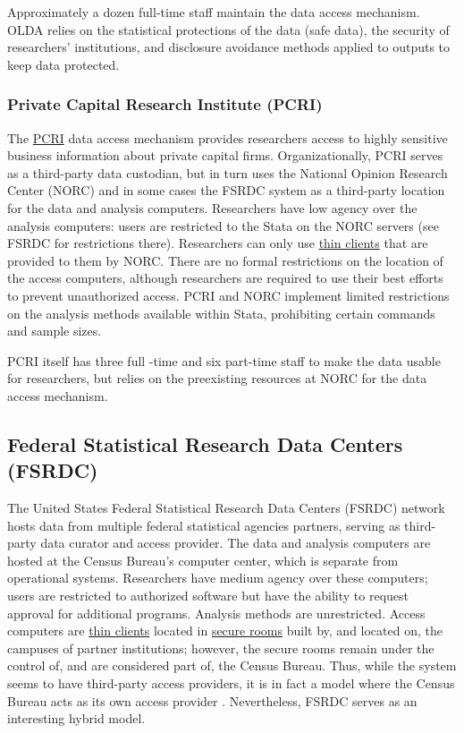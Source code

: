 Approximately a dozen full-time staff maintain the data access mechanism. OLDA relies on the statistical protections of the data (safe data), the security of researchers' institutions, and disclosure avoidance methods applied to outputs to keep data protected.

\hypertarget{private-capital-research-institute-pcri}{%
\subsubsection{Private Capital Research Institute (PCRI)}\label{private-capital-research-institute-pcri}}

The \protect\hyperlink{pcri}{PCRI} data access mechanism provides researchers access to highly sensitive business information about private capital firms. Organizationally, PCRI serves as a third-party data custodian, but in turn uses the National Opinion Research Center (NORC) and in some cases the FSRDC system as a third-party location for the data and analysis computers. Researchers have low agency over the analysis computers: users are restricted to the Stata on the NORC servers (see FSRDC for restrictions there). Researchers can only use \protect\hyperlink{thin-clients}{thin clients} that are provided to them by NORC. There are no formal restrictions on the location of the access computers, although researchers are required to use their best efforts to prevent unauthorized access. PCRI and NORC implement limited restrictions on the analysis methods available within Stata, prohibiting certain commands and sample sizes.

PCRI itself has three full -time and six part-time staff to make the data usable for researchers, but relies on the preexisting resources at NORC for the data access mechanism.

\hypertarget{federal-statistical-research-data-centers-fsrdc}{%
\subsection{Federal Statistical Research Data Centers (FSRDC)}\label{federal-statistical-research-data-centers-fsrdc}}

The United States Federal Statistical Research Data Centers (FSRDC) network hosts data from multiple federal statistical agencies partners, serving as third-party data curator and access provider. The data and analysis computers are hosted at the Census Bureau's computer center, which is separate from operational systems. Researchers have medium agency over these computers; users are restricted to authorized software but have the ability to request approval for additional programs. Analysis methods are unrestricted. Access computers are \protect\hyperlink{thin-clients}{thin clients} located in \protect\hyperlink{secure-rooms}{secure rooms} built by, and located on, the campuses of partner institutions; however, the secure rooms remain under the control of, and are considered part of, the Census Bureau. Thus, while the system seems to have third-party access providers, it is in fact a model where the Census Bureau acts as its own access provider \citep{unitedstatescensusbureaua}. Nevertheless, FSRDC serves as an interesting hybrid model.


